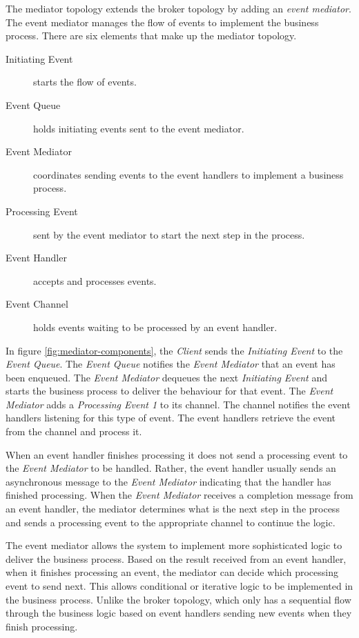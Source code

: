 The mediator topology extends the broker topology by adding an \emph{event mediator}.
The event mediator manages the flow of events to implement the business process.
There are six elements that make up the mediator topology.

\begin{description}
    \item[Initiating Event] starts the flow of events.
    \item[Event Queue] holds initiating events sent to the event mediator.
    \item[Event Mediator] coordinates sending events to the event handlers to implement a business process.
    \item[Processing Event] sent by the event mediator to start the next step in the process.
    \item[Event Handler] accepts and processes events.
    \item[Event Channel] holds events waiting to be processed by an event handler.
\end{description}

In figure \ref{fig:mediator-components}, the \emph{Client} sends the \emph{Initiating Event} to the \emph{Event Queue}.
The \emph{Event Queue} notifies the \emph{Event Mediator} that an event has been enqueued.
The \emph{Event Mediator} dequeues the next \emph{Initiating Event} and starts the business process to deliver the behaviour for that event.
The \emph{Event Mediator} adds a \emph{Processing Event 1} to its channel.
The channel notifies the event handlers listening for this type of event.
The event handlers retrieve the event from the channel and process it.

When an event handler finishes processing it does not send a processing event to the \emph{Event Mediator} to be handled.
Rather, the event handler usually sends an asynchronous message to the \emph{Event Mediator} indicating that the handler has finished processing.
When the \emph{Event Mediator} receives a completion message from an event handler,
the mediator determines what is the next step in the process and sends a processing event to the appropriate channel to continue the logic.

The event mediator allows the system to implement more sophisticated logic to deliver the business process.
Based on the result received from an event handler, when it finishes processing an event,
the mediator can decide which processing event to send next.
This allows conditional or iterative logic to be implemented in the business process.
Unlike the broker topology, which only has a sequential flow through the business logic based on event handlers sending new events when they finish processing.


